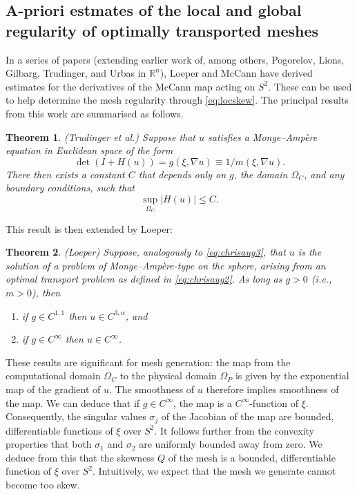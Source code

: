 \documentclass[11pt, a4paper]{scrartcl}  %
\theoremstyle{plain}
\newtheorem{theorem}{Theorem}
\theoremstyle{definition}
\numberwithin{equation}{section}
\begin{document}
\subsection{A-priori estmates of the local and global regularity of optimally transported meshes}
\label{ssec:otreg}

In a series of papers (extending earlier work of, among others,
Pogorelov, Lions, Gilbarg, Trudinger, and Urbas in $\mathbb{R}^n$),
Loeper \citep{loeper2011regularity} and McCann \citep{mccann2001polar}
have derived estimates for the derivatives of the McCann map acting on
$S^2$. These can be used to help determine the mesh regularity through
\cref{eq:locskew}. The principal results from this work are summarised
as follows.
\begin{theorem}
\emph{(Trudinger et al.)} Suppose that $u$ satisfies a Monge--Ampère
equation in Euclidean space of the form
\begin{equation}
\label{eq:chrisaug3}
\det(I + H(u)) = g(\xi,\nabla u) \equiv 1/m(\xi,\nabla u).
\end{equation}
There then exists a constant $C$ that depends only on $g$, the domain
$\Omega_C$, and any boundary conditions, such that
\begin{equation}
\sup_{\Omega_C} |H(u)| \leq C.
\end{equation}
\end{theorem}
This result is then extended by Loeper:
\begin{theorem}
\emph{(Loeper)} Suppose, analogously to \cref{eq:chrisaug3}, that $u$
is the solution of a problem of Monge--Ampère-type on the sphere,
arising from an optimal transport problem as defined in
\cref{eq:chrisaug2}. As long as $g > 0$ (\emph{i.e.}, $m > 0$), then
\begin{enumerate}
  \item if $g \in C^{1,1}$ then $u \in C^{3,\alpha}$, and
  \item if $g \in C^{\infty}$ then $u \in C^{\infty}$.
\end{enumerate}
\end{theorem}

These results are significant for mesh generation: the map
from the computational domain $\Omega_C$ to the physical domain
$\Omega_P$ is given by the exponential map of the gradient of $u$. The
smoothness of $u$ therefore implies smoothness of the map. We can deduce
that if $g \in C^{\infty}$, the map is a $C^{\infty}$-function of $\xi$.
Consequently, the singular values $\sigma_j$ of the Jacobian of the map
are bounded, differentiable functions of $\xi$ over $S^2$. It follows
further from the convexity properties that both $\sigma_1$ and
$\sigma_2$ are uniformly bounded away from zero. We deduce from this
that the skewness $Q$ of the mesh is a bounded, differentiable function
of $\xi$ over $S^2$. Intuitively, we expect that the mesh we generate
cannot become too skew.
\end{document}
